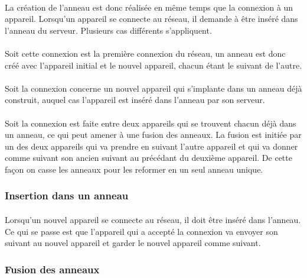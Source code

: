 \documentclass[a4paper,10pt]{report}
\begin{document}
      \paragraph{}
      La création de l'anneau est donc réalisée en même temps que la connexion à un appareil. Lorsqu'un appareil se connecte au réseau, il demande à être inséré dans l'anneau du serveur. Plusieurs cas différents s'appliquent. 
      \paragraph{}
      Soit cette connexion est la première connexion du réseau, un anneau est donc créé avec l'appareil initial et le nouvel appareil, chacun étant le suivant de l'autre.
      \paragraph{}
      Soit la connexion concerne un nouvel appareil qui s'implante dans un anneau déjà construit, auquel cas l'appareil est inséré dans l'anneau par son serveur.
      \paragraph{}
      Soit la connexion est faite entre deux appareils qui se trouvent chacun déjà dans un anneau, ce qui peut amener à une fusion des anneaux. La fusion est initiée par un des deux appareils qui va prendre en suivant l'autre appareil et qui va donner comme suivant son ancien suivant au précédant du deuxième appareil. De cette façon on casse les anneaux pour les reformer en un seul anneau unique.
      
      \subsubsection{Insertion dans un anneau}
      \paragraph{}
      Lorsqu'un nouvel appareil se connecte au réseau, il doit être inséré dans l'anneau. Ce qui se passe est que l'appareil qui a accepté la connexion va envoyer son suivant au nouvel appareil et garder le nouvel appareil comme suivant.
      
      \subsubsection{Fusion des anneaux}
\end{document}
